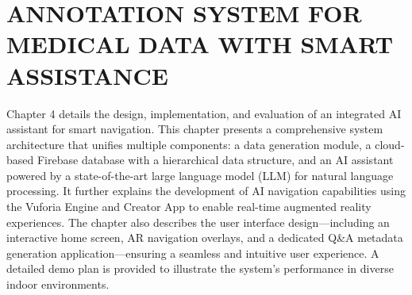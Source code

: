 \chapter{ANNOTATION SYSTEM FOR MEDICAL DATA WITH SMART ASSISTANCE}
\label{sec:ANNOTATION SYSTEM FOR MEDICAL DATA WITH SMART ASSISTANCE}
\begin{ChapAbstract}
Chapter 4 details the design, implementation, and evaluation of an integrated AI assistant for smart navigation. This chapter presents a comprehensive system architecture that unifies multiple components: a data generation module, a cloud-based Firebase database with a hierarchical data structure, and an AI assistant powered by a state-of-the-art large language model (LLM) for natural language processing. It further explains the development of AI navigation capabilities using the Vuforia Engine and Creator App to enable real-time augmented reality experiences. The chapter also describes the user interface design—including an interactive home screen, AR navigation overlays, and a dedicated Q\&A metadata generation application—ensuring a seamless and intuitive user experience. A detailed demo plan is provided to illustrate the system's performance in diverse indoor environments.
\end{ChapAbstract}




